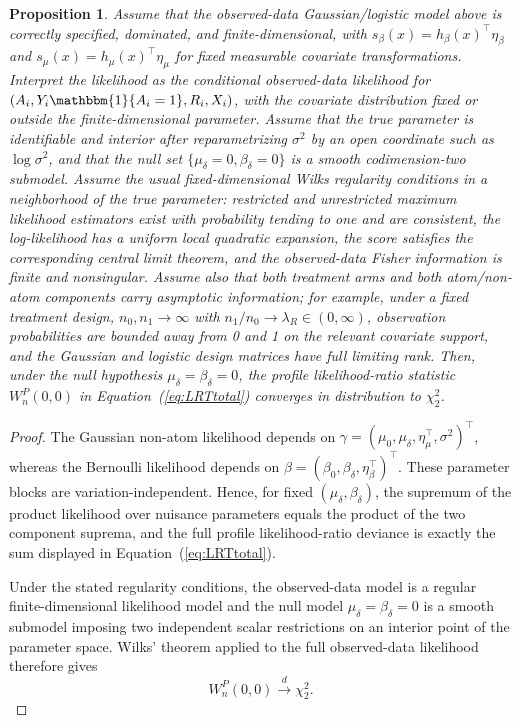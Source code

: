 \documentclass[11pt]{article}
\newtheorem{proposition}{Proposition}
\begin{document}
\begin{proposition}
Assume that the observed-data Gaussian/logistic model above is correctly specified, dominated, and finite-dimensional, with $s_\beta(x)=h_\beta(x)^\top\eta_\beta$ and $s_\mu(x)=h_\mu(x)^\top\eta_\mu$ for fixed measurable covariate transformations. Interpret the likelihood as the conditional observed-data likelihood for $(A_i,Y_i\mathbbm{1}\{A_i=1\},R_i,X_i)$, with the covariate distribution fixed or outside the finite-dimensional parameter. Assume that the true parameter is identifiable and interior after reparametrizing $\sigma^2$ by an open coordinate such as $\log\sigma^2$, and that the null set $\{\mu_\delta=0,\beta_\delta=0\}$ is a smooth codimension-two submodel. Assume the usual fixed-dimensional Wilks regularity conditions in a neighborhood of the true parameter: restricted and unrestricted maximum likelihood estimators exist with probability tending to one and are consistent, the log-likelihood has a uniform local quadratic expansion, the score satisfies the corresponding central limit theorem, and the observed-data Fisher information is finite and nonsingular. Assume also that both treatment arms and both atom/non-atom components carry asymptotic information; for example, under a fixed treatment design, $n_0,n_1\to\infty$ with $n_1/n_0\to\lambda_R\in(0,\infty)$, observation probabilities are bounded away from 0 and 1 on the relevant covariate support, and the Gaussian and logistic design matrices have full limiting rank. Then, under the null hypothesis $\mu_\delta = \beta_\delta = 0$, the profile likelihood-ratio statistic $W_n^P(0,0)$ in Equation~(\ref{eq:LRTtotal}) converges in distribution to $\chi^2_2$.
\end{proposition}

\begin{proof}
The Gaussian non-atom likelihood depends on $\gamma=(\mu_0,\mu_\delta,\eta_\mu^\top,\sigma^2)^\top$, whereas the Bernoulli likelihood depends on $\beta=(\beta_0,\beta_\delta,\eta_\beta^\top)^\top$. These parameter blocks are variation-independent. Hence, for fixed $(\mu_\delta,\beta_\delta)$, the supremum of the product likelihood over nuisance parameters equals the product of the two component suprema, and the full profile likelihood-ratio deviance is exactly the sum displayed in Equation~(\ref{eq:LRTtotal}).

Under the stated regularity conditions, the observed-data model is a regular finite-dimensional likelihood model and the null model $\mu_\delta=\beta_\delta=0$ is a smooth submodel imposing two independent scalar restrictions on an interior point of the parameter space. Wilks' theorem \citep{wilks1938large} applied to the full observed-data likelihood therefore gives
\[
  W_n^P(0,0)\overset{d}{\longrightarrow}\chi^2_2 .
\]
\end{proof}
\end{document}
